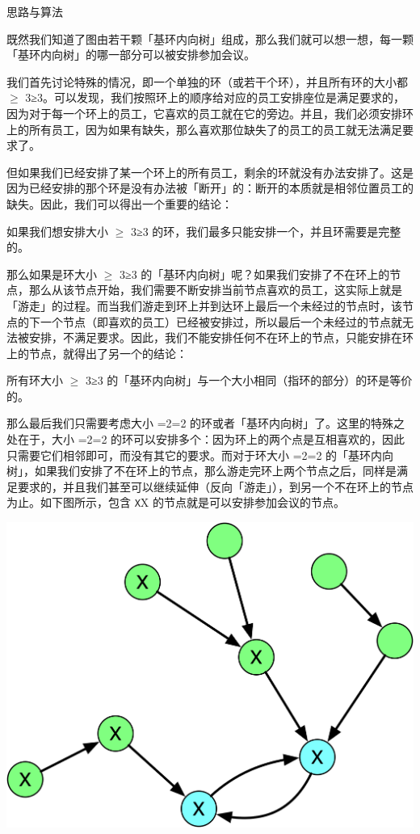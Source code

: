 \documentclass[9pt, b5paaper]{book}
\begin{document}
\begin{enumerate}
思路与算法

既然我们知道了图由若干颗「基环内向树」组成，那么我们就可以想一想，每一颗「基环内向树」的哪一部分可以被安排参加会议。

我们首先讨论特殊的情况，即一个单独的环（或若干个环），并且所有环的大小都 $\ge$ 3≥3。可以发现，我们按照环上的顺序给对应的员工安排座位是满足要求的，因为对于每一个环上的员工，它喜欢的员工就在它的旁边。并且，我们必须安排环上的所有员工，因为如果有缺失，那么喜欢那位缺失了的员工的员工就无法满足要求了。

但如果我们已经安排了某一个环上的所有员工，剩余的环就没有办法安排了。这是因为已经安排的那个环是没有办法被「断开」的：断开的本质就是相邻位置员工的缺失。因此，我们可以得出一个重要的结论：

如果我们想安排大小 $\ge$ 3≥3 的环，我们最多只能安排一个，并且环需要是完整的。

那么如果是环大小 $\ge$ 3≥3 的「基环内向树」呢？如果我们安排了不在环上的节点，那么从该节点开始，我们需要不断安排当前节点喜欢的员工，这实际上就是「游走」的过程。而当我们游走到环上并到达环上最后一个未经过的节点时，该节点的下一个节点（即喜欢的员工）已经被安排过，所以最后一个未经过的节点就无法被安排，不满足要求。因此，我们不能安排任何不在环上的节点，只能安排在环上的节点，就得出了另一个的结论：

所有环大小 $\ge$ 3≥3 的「基环内向树」与一个大小相同（指环的部分）的环是等价的。

那么最后我们只需要考虑大小 =2=2 的环或者「基环内向树」了。这里的特殊之处在于，大小 =2=2 的环可以安排多个：因为环上的两个点是互相喜欢的，因此只需要它们相邻即可，而没有其它的要求。而对于环大小 =2=2 的「基环内向树」，如果我们安排了不在环上的节点，那么游走完环上两个节点之后，同样是满足要求的，并且我们甚至可以继续延伸（反向「游走」），到另一个不在环上的节点为止。如下图所示，包含 \texttt{X}X 的节点就是可以安排参加会议的节点。

\includegraphics[width=.9\linewidth]{./pic/2277tree-2.png}


\end{enumerate}
\end{document}
